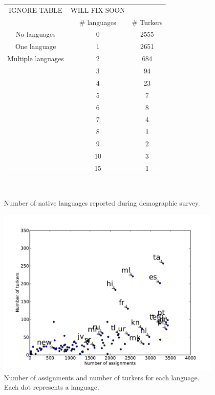 \documentclass[11pt]{article}
\begin{document}
\begin{figure}[h]
\begin{tabular}{ccc}\hline\hline
IGNORE TABLE& WILL FIX SOON&\\
&\# languages&\# Turkers\\
\hline
No languages&0&2555\\
One language&1&2651\\
Multiple languages&2&684\\
&3&94\\
&4&23\\
&5&7\\
&6&8\\
&7&4\\
&8&1\\
&9&2\\
&10&3\\
&15&1\\
\hline\hline
\end{tabular}
\label{numlangs-tab}\\
\caption{Number of native languages reported during demographic survey.}
\end{figure}

\begin{figure}[h]
\centering
\includegraphics[width=6in]{figures/assign-turk-scatter}
\caption{Number of assignments and number of turkers for each language. Each dot represents a language.}
\label{ass-scatter}
\end{figure}
\end{document}

